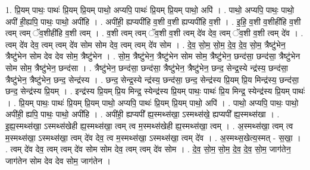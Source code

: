 \documentclass[17pt]{extarticle}
\begin{document}
1. प्रि॒यम् पाथः॒ पाथः॑ प्रि॒यम् प्रि॒यम् पाथो॒ अप्यपि॒ पाथः॑ प्रि॒यम् प्रि॒यम् पाथो॒ अपि॑ । . पाथो॒ अप्यपि॒ पाथः॒ पाथो॒ अपी॑ ही॒ह्यपि॒ पाथः॒ पाथो॒ अपी॑हि । . अपी॑ही॒ ह्यप्यपी॑हि व॒शी व॒शी ह्यप्यपी॑हि व॒शी । . इ॒हि॒ व॒शी व॒शीही॑हि व॒शी त्वम् त्वम् ॅव॒शीही॑हि व॒शी त्वम् । . व॒शी त्वम् त्वम् ॅव॒शी व॒शी त्वम् दे॑व देव॒ त्वम् ॅव॒शी व॒शी त्वम् दे॑व । . त्वम् दे॑व देव॒ त्वम् त्वम् दे॑व सोम सोम देव॒ त्वम् त्वम् दे॑व सोम । . दे॒व॒ सो॒म॒ सो॒म॒ दे॒व॒ दे॒व॒ सो॒म॒ त्रैष्टु॑भेन॒ त्रैष्टु॑भेन सोम देव देव सोम॒ त्रैष्टु॑भेन । . सो॒म॒ त्रैष्टु॑भेन॒ त्रैष्टु॑भेन सोम सोम॒ त्रैष्टु॑भेन॒ छन्द॑सा॒ छन्द॑सा॒ त्रैष्टु॑भेन सोम सोम॒ त्रैष्टु॑भेन॒ छन्द॑सा । . त्रैष्टु॑भेन॒ छन्द॑सा॒ छन्द॑सा॒ त्रैष्टु॑भेन॒ त्रैष्टु॑भेन॒ छन्द॒ सेन्द्र॒स्ये न्द्र॑स्य॒ छन्द॑सा॒ त्रैष्टु॑भेन॒ त्रैष्टु॑भेन॒ छन्द॒ सेन्द्र॑स्य । . छन्द॒ सेन्द्र॒स्ये न्द्र॑स्य॒ छन्द॑सा॒ छन्द॒ सेन्द्र॑स्य प्रि॒यम् प्रि॒य मिन्द्र॑स्य॒ छन्द॑सा॒ छन्द॒ सेन्द्र॑स्य प्रि॒यम् । . इन्द्र॑स्य प्रि॒यम् प्रि॒य मिन्द्र॒ स्येन्द्र॑स्य प्रि॒यम् पाथः॒ पाथः॑ प्रि॒य मिन्द्र॒ स्येन्द्र॑स्य प्रि॒यम् पाथः॑ । . प्रि॒यम् पाथः॒ पाथः॑ प्रि॒यम् प्रि॒यम् पाथो॒ अप्यपि॒ पाथः॑ प्रि॒यम् प्रि॒यम् पाथो॒ अपि॑ । . पाथो॒ अप्यपि॒ पाथः॒ पाथो॒ अपी॑ही॒ ह्यपि॒ पाथः॒ पाथो॒ अपी॑हि । . अपी॑ही॒ ह्यप्यपी᳚ ह्य॒स्मथ्स॑खा॒ ऽस्मथ्स॑खे॒ ह्यप्यपी᳚ ह्य॒स्मथ्स॑खा । . इ॒ह्य॒स्मथ्स॑खा॒ ऽस्मथ्स॑खेही ह्य॒स्मथ्स॑खा॒ त्वम् त्व म॒स्मथ्स॑खेही ह्य॒स्मथ्स॑खा॒ त्वम् । . अ॒स्मथ्स॑खा॒ त्वम् त्व म॒स्मथ्स॑खा॒ ऽस्मथ्स॑खा॒ त्वम् दे॑व देव॒ त्व म॒स्मथ्स॑खा॒ ऽस्मथ्स॑खा॒ त्वम् दे॑व । . अ॒स्मथ्स॒खेत्य॒स्मत् - स॒खा॒ । . त्वम् दे॑व देव॒ त्वम् त्वम् दे॑व सोम सोम देव॒ त्वम् त्वम् दे॑व सोम । . दे॒व॒ सो॒म॒ सो॒म॒ दे॒व॒ दे॒व॒ सो॒म॒ जाग॑तेन॒ जाग॑तेन सोम देव देव सोम॒ जाग॑तेन । \newline
\end{document}
